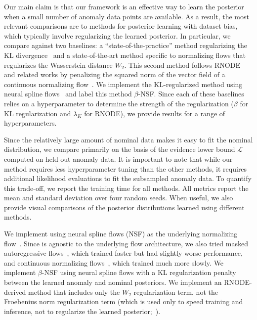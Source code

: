 Our main claim is that our \ouralg{} framework is an effective way to learn the posterior when a small number of anomaly data points are available. As a result, the most relevant comparisons are to methods for posterior learning with dataset bias, which typically involve regularizing the learned posterior. In particular, we compare against two baselines: a ``state-of-the-practice'' method regularizing the KL divergence~\cite{asimInvertibleGenerativeModels2020,higginsBetaVAELearningBasic2016} and a state-of-the-art method specific to normalizing flows that regularizes the Wasserstein distance $W_2$. This second method follows RNODE and related works by penalizing the squared norm of the vector field of a continuous normalizing flow~\cite{finlayHowTrainYour2020,onkenOTFlowFastAccurate2021}. We implement the KL-regularized method using neural spline flows~\cite{durkanNeuralSplineFlows2019} and label this method $\beta$-NSF. Since each of these baselines relies on a hyperparameter to determine the strength of the regularization ($\beta$ for KL regularization and $\lambda_K$ for RNODE), we provide results for a range of hyperparameters.

Since the relatively large amount of nominal data makes it easy to fit the nominal distribution, we compare primarily on the basis of the evidence lower bound $\mathcal{L}$ computed on held-out anomaly data. It is important to note that while our method requires less hyperparameter tuning than the other methods, it requires additional likelihood evaluations to fit the subsampled anomaly data. To quantify this trade-off, we report the training time for all methods. All metrics report the mean and standard deviation over four random seeds. When useful, we also provide visual comparisons of the posterior distributions learned using different methods.

We implement \ouralg{} using neural spline flows (NSF) as the underlying normalizing flow~\cite{durkanNeuralSplineFlows2019}. Since \ouralg{} is agnostic to the underlying flow architecture, we also tried masked autoregressive flows~\cite{huangNeuralAutoregressiveFlows2018}, which trained faster but had slightly worse performance, and continuous normalizing flows~\cite{chenNeuralOrdinaryDifferential2018}, which trained much more slowly.
%
We implement $\beta$-NSF using neural spline flows with a KL regularization penalty between the learned anomaly and nominal posteriors. We implement an RNODE-derived method that includes only the $W_2$ regularization term, not the Froebenius norm regularization term (which is used only to speed training and inference, not to regularize the learned posterior;~\cite{finlayHowTrainYour2020}).

